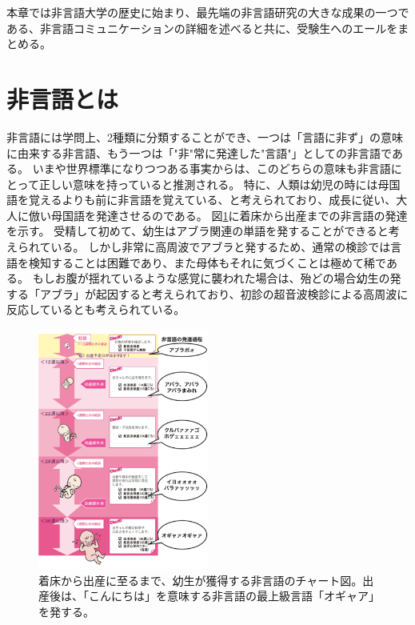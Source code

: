本章では非言語大学の歴史に始まり、最先端の非言語研究の大きな成果の一つである、非言語コミュニケーションの詳細を述べると共に、受験生へのエールをまとめる。





\section{非言語とは}
非言語には学問上、2種類に分類することができ、一つは「言語に非ず」の意味に由来する非言語、もう一つは「"非"常に発達した"言語"」としての非言語である。
いまや世界標準になりつつある事実からは、このどちらの意味も非言語にとって正しい意味を持っていると推測される。
特に、人類は幼児の時には母国語を覚えるよりも前に非言語を覚えている、と考えられており、成長に従い、大人に倣い母国語を発達させるのである。
図\ref{Fig:HigengoDevelop}に着床から出産までの非言語の発達を示す。
受精して初めて、幼生はアブラ関連の単語を発することができると考えられている。
しかし非常に高周波でアブラと発するため、通常の検診では言語を検知することは困難であり、また母体もそれに気づくことは極めて稀である。
もしお腹が揺れているような感覚に襲われた場合は、殆どの場合幼生の発する「アブラ」が起因すると考えられており、初診の超音波検診による高周波に反応しているとも考えられている。
\begin{figure}[h]
\centering
\includegraphics[width=0.5\textwidth]{./section/HigengoUniv/figures/baby.pdf}
\caption{着床から出産に至るまで、幼生が獲得する非言語のチャート図。出産後は、「こんにちは」を意味する非言語の最上級言語「オギャア」を発する。}
\label{Fig:HigengoDevelop}
\end{figure}

